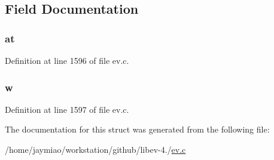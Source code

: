 \subsection{\-Field \-Documentation}
\hypertarget{struct_a_n_h_e_a6160b512f37d4b32af5c7bad0c700b93}{
\subsubsection[{at}]{ {\bf at}}}\label{struct_a_n_h_e_a6160b512f37d4b32af5c7bad0c700b93}


\-Definition at line 1596 of file ev.\-c.

\hypertarget{struct_a_n_h_e_af273b2db3bb121b1f6bd0ef8eff603e6}{
\subsubsection[{w}]{ {\bf w}}}\label{struct_a_n_h_e_af273b2db3bb121b1f6bd0ef8eff603e6}


\-Definition at line 1597 of file ev.\-c.



\-The documentation for this struct was generated from the following file\-:\begin{DoxyCompactItemize}
\item 
/home/jaymiao/workstation/github/libev-\/4./\hyperlink{ev_8c}{ev.\-c}\end{DoxyCompactItemize}
